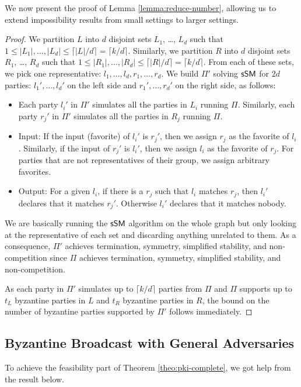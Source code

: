 We now present the proof of Lemma \ref{lemma:reduce-number}, allowing us to extend impossibility results from small settings to larger settings.
\ReduceNumberLemma*
\begin{proof}
We partition $L$ into $d$ disjoint sets $L_1$, \dots, $L_d$ such that $1 \leq |L_1|,\dots,|L_d| \leq \lceil |L| / d \rceil = \lceil k/d \rceil$. Similarly, we partition $R$ into $d$ disjoint sets $R_1$, \dots, $R_d$ such that $1 \leq |R_1|,\dots,|R_d| \leq \lceil |R| / d \rceil = \lceil k/d \rceil$. From each of these sets, we pick one representative: $l_1, \dots, l_d, r_1, \dots, r_d$. We build $\Pi'$ solving $\textsf{sSM}$ for $2d$ parties: $l_1', \dots, l_d'$ on the left side and $r_1', \dots, r_d'$ on the right side, as follows:
\begin{itemize}[nosep]
\item Each party $l_i'$ in $\Pi'$ simulates all the parties in $L_i$ running $\Pi$. Similarly, each party $r_j'$ in $\Pi'$ simulates all the parties in $R_j$ running $\Pi$.
\item Input: If the input (favorite) of $l_i'$ is $r_j'$, then we assign $r_j$ as the favorite of $l_i$. Similarly, if the input of $r_j'$ is $l_i'$, then we assign $l_i$ as the favorite of $r_j$. For parties that are not representatives of their group, we assign arbitrary favorites.
\item Output: For a given $l_i$, if there is a $r_j$ such that $l_i$ matches $r_j$, then $l_i'$ declares that it matches $r_j'$. Otherwise $l_i'$ declares that it matches nobody.
\end{itemize}

We are basically running the $\textsf{sSM}$ algorithm on the whole graph but only looking at the representative of each set and discarding anything unrelated to them. As a consequence, $\Pi'$ achieves termination, symmetry, simplified stability, and non-competition since $\Pi$ achieves termination, symmetry, simplified stability, and non-competition. 

As each party in $\Pi'$ simulates up to $\lceil k / d \rceil$ parties 
from $\Pi$ and $\Pi$ supports up to $t_L$ byzantine parties in $L$ and $t_R$ byzantine parties in $R$, the bound on the number of byzantine parties supported by $\Pi'$ follows immediately.
\end{proof}

\subsection{Byzantine Broadcast with General Adversaries}\label{appendix:general-adversaries}
To achieve the feasibility part of Theorem \ref{theo:pki-complete}, 
we got help from the result below.

